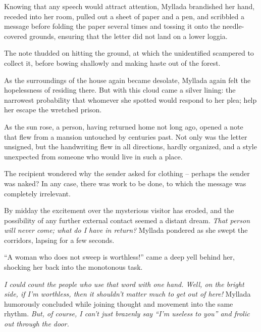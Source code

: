 Knowing that any speech would attract attention, Myllada brandished her hand, receded into her room, pulled out a sheet of paper and a pen, and scribbled a message before folding the paper several times and tossing it onto the needle-covered grounds, ensuring that the letter did not land on a lower loggia.

The note thudded on hitting the ground, at which the unidentified scampered to collect it, before bowing shallowly and making haste out of the forest.

As the surroundings of the house again became desolate, Myllada again felt the hopelessness of residing there. But with this cloud came a silver lining: the narrowest probability that whomever she spotted would respond to her plea; help her escape the wretched prison.

\centeredstars

As the sun rose, a person, having returned home not long ago, opened a note that flew from a mansion untouched by centuries past. Not only was the letter unsigned, but the handwriting flew in all directions, hardly organized, and a style unexpected from someone who would live in such a place.


The recipient wondered why the sender asked for clothing -- perhaps the sender was naked? In any case, there was work to be done, to which the message was completely irrelevant.

\centeredstars

By midday the excitement over the mysterious visitor has eroded, and the possibility of any further external contact seemed a distant dream. \emph{That person will never come; what do I have in return?} Myllada pondered as she swept the corridors, lapsing for a few seconds.

``A woman who does not sweep is worthless!'' came a deep yell behind her, shocking her back into the monotonous task.

\emph{I could count the people who use that word with one hand. Well, on the bright side, if I'm worthless, then it shouldn't matter much to get out of here!} Myllada humorously concluded while joining thought and movement into the same rhythm. \emph{But, of course, I can't just brazenly say ``I'm useless to you'' and frolic out through the door.}

